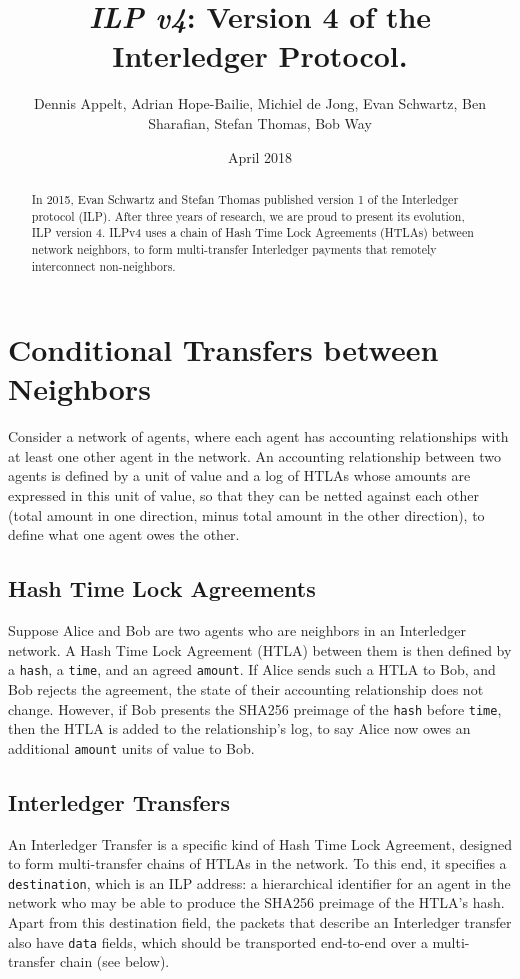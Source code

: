\documentclass[11pt,twoside,a4paper]{article}
\begin{document}
\title{{\em ILP v4}: Version 4 of the Interledger Protocol.}
\author{Dennis Appelt, Adrian Hope-Bailie, Michiel de Jong, Evan Schwartz, Ben Sharafian, Stefan Thomas, Bob Way}
\date{April 2018}
\maketitle
\begin{abstract}
In 2015, Evan Schwartz and Stefan Thomas published version 1 of the Interledger protocol (ILP). After three years of research,
we are proud to present its evolution, ILP version 4. ILPv4 uses a chain of Hash Time Lock Agreements (HTLAs) between network neighbors, to form
multi-transfer Interledger payments that remotely interconnect non-neighbors.
\end{abstract}

\section{Conditional Transfers between Neighbors}
Consider a network of agents, where each agent has accounting relationships with at least one other agent in the network. An accounting
relationship between two agents is defined by a unit of value and a log of HTLAs whose amounts are expressed in this unit of value, so that they
can be netted against each other (total amount in one direction, minus total amount in the other direction), to define what one agent owes the other.

\subsection{Hash Time Lock Agreements}
Suppose Alice and Bob are two agents who are neighbors in an Interledger network. A Hash Time Lock Agreement (HTLA) between them is then
defined by a {\tt hash}, a {\tt time}, and an agreed {\tt amount}. If Alice sends such a HTLA to Bob, and Bob rejects the agreement, the state of their accounting
relationship does not change. However, if Bob presents the SHA256 preimage of the {\tt hash} before {\tt time}, then the HTLA is added to the relationship's log, to say Alice
now  owes an additional {\tt amount} units of value to Bob.

\subsection{Interledger Transfers}
An Interledger Transfer is a specific kind of Hash Time Lock Agreement, designed to form multi-transfer chains of HTLAs in the network. To this end,
it specifies a {\tt destination}, which is an ILP address: a hierarchical identifier for an agent in the network who may be able to produce the SHA256 preimage of the
HTLA's hash. Apart from this destination field, the packets that describe an Interledger transfer also have {\tt data} fields, which should be transported end-to-end over a multi-transfer chain (see below).
\end{document}
